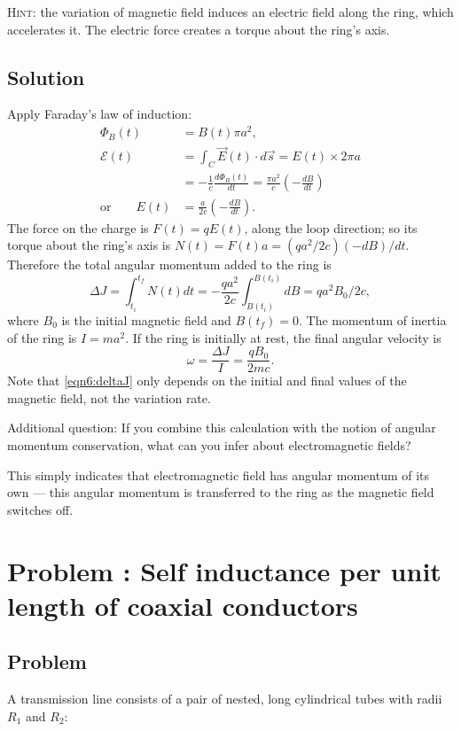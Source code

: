 \documentclass[solutions]{esg8022pset}
\begin{document}
  \noindent \textsc{Hint}: the variation of magnetic field induces an electric
  field along the ring, which accelerates it. The electric force creates a
  torque about the ring's axis.
\subsection{Solution}
  Apply Faraday's law of induction:
  \begin{align*}
    \Phi_B(t) & = B(t)\pi a^2, \\
    {\mathcal{E}}(t) & = \int_C \vec{E}(t)\cdot d\vec{s} = E(t)\times 2\pi a \\
      & = -\frac{1}{c}\frac{d\Phi_B(t)}{dt}=\frac{\pi a^2}{c}\left(-\frac{dB}{dt}\right) \\
  \text{or}\qquad E(t) & = \frac{a}{2c}\left(-\frac{dB}{dt}\right).
  \end{align*}
  The force on the charge is $F(t)=qE(t)$, along the loop
  direction; so its torque about the ring's axis is $N(t)=F(t)a=
  (qa^2/2c)(-dB)/dt$.  Therefore the total angular momentum added to the ring is
  \begin{equation}\label{eqn6:deltaJ}
    \Delta J=\int_{t_{i}}^{t_{f}} N(t)dt=-\frac{qa^2}{2c}\int_{B(t_{i})}^{B(t_{i})}dB=qa^2 B_0/2c,
  \end{equation}
  where $B_0$ is the initial magnetic field and $B(t_{f})=0$.  The
  momentum of inertia of the ring is  $I=ma^2$.  If the ring is
  initially at rest, the final angular velocity is
  \begin{equation}
    \omega=\frac{\Delta J}{I}=\frac{qB_0}{2mc}.
  \end{equation}
  Note that \autoref{eqn6:deltaJ} only depends on the initial and final
  values of the magnetic field, not the variation rate.

  Additional question: If you combine this calculation with the notion
  of angular momentum conservation, what can you infer about
  electromagnetic fields?

  This simply indicates that electromagnetic field has angular momentum
  of its own --- this angular momentum is transferred to the ring as the
  magnetic field switches off.
\section{Problem \thesection: Self inductance per unit length of coaxial conductors }
\subsection{Problem}
  A transmission line consists of a pair of nested, long cylindrical
  tubes with radii $R_1$ and $R_2$:
\end{document}
